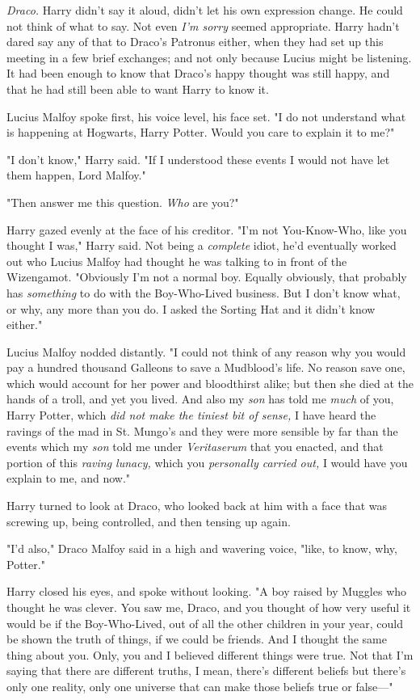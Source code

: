 \emph{Draco.} Harry didn't say it aloud, didn't let his own expression change.
He could not think of what to say. Not even \emph{I'm sorry} seemed
appropriate. Harry hadn't dared say any of that to Draco's Patronus either,
when they had set up this meeting in a few brief exchanges; and not only
because Lucius might be listening. It had been enough to know that Draco's
happy thought was still happy, and that he had still been able to want Harry to
know it.

Lucius Malfoy spoke first, his voice level, his face set. "I do not understand
what is happening at Hogwarts, Harry Potter. Would you care to explain it to
me?"

"I don't know," Harry said. "If I understood these events I would not have let
them happen, Lord Malfoy."

"Then answer me this question. \emph{Who} are you?"

Harry gazed evenly at the face of his creditor. "I'm not You-Know-Who, like you
thought I was," Harry said. Not being a \emph{complete} idiot, he'd eventually
worked out who Lucius Malfoy had thought he was talking to in front of the
Wizengamot. "Obviously I'm not a normal boy. Equally obviously, that probably
has \emph{something} to do with the Boy-Who-Lived business. But I don't know
what, or why, any more than you do. I asked the Sorting Hat and it didn't know
either."

Lucius Malfoy nodded distantly. "I could not think of any reason why you would
pay a hundred thousand Galleons to save a Mudblood's life. No reason save one,
which would account for her power and bloodthirst alike; but then she died at
the hands of a troll, and yet you lived. And also my \emph{son} has told me
\emph{much} of you, Harry Potter, which \emph{did not make the tiniest bit of
sense,} I have heard the ravings of the mad in St. Mungo's and they were more
sensible by far than the events which my \emph{son} told me under
\emph{Veritaserum} that you enacted, and that portion of this \emph{raving
lunacy,} which you \emph{personally carried out,} I would have you explain to
me, and now."

Harry turned to look at Draco, who looked back at him with a face that was
screwing up, being controlled, and then tensing up again.

"I'd also," Draco Malfoy said in a high and wavering voice, "like, to know,
why, Potter."

Harry closed his eyes, and spoke without looking. "A boy raised by Muggles who
thought he was clever. You saw me, Draco, and you thought of how very useful it
would be if the Boy-Who-Lived, out of all the other children in your year,
could be shown the truth of things, if we could be friends. And I thought the
same thing about you. Only, you and I believed different things were true. Not
that I'm saying that there are different truths, I mean, there's different
beliefs but there's only one reality, only one universe that can make those
beliefs true or false\mbox{---}"

